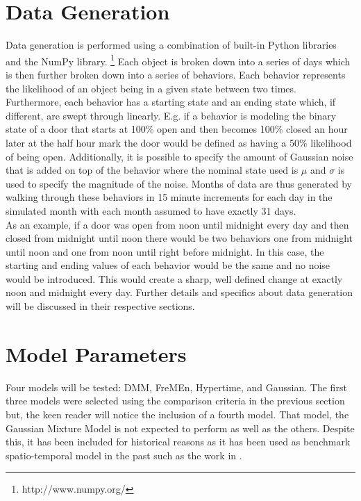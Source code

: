  \section{ Data Generation }

  Data generation is performed using a combination of built-in Python libraries and
  the NumPy library. \footnote[1]{http://www.numpy.org/} Each object is broken down into a series of days which is
  then further broken down into a series of behaviors. Each behavior
  represents the likelihood of an object being in a given state between two
  times. Furthermore, each behavior has a starting state and an ending state
  which, if different, are swept through linearly. E.g. if a behavior is
  modeling the binary state of a door that starts at 100\% open and then becomes
  100\% closed an hour later at the half hour mark the door would be defined as having
  a 50\% likelihood of being open. Additionally, it is possible
  to specify the amount of Gaussian noise that is added on top of the
  behavior where the nominal state used is $\mu$ and $\sigma$ is used to
  specify the magnitude of the noise. Months of data are thus generated by
  walking through these behaviors in 15 minute increments for each day in the
  simulated month with each month assumed to have exactly 31 days. \\

  As an example, if a door was open from noon until midnight every day and then closed from
  midnight until noon there would be two behaviors one from midnight until
  noon and one from noon until right before midnight. In this case, the
  starting and ending values of each behavior would be the same and no noise
  would be introduced. This would create a sharp, well defined change at
  exactly noon and midnight every day. Further details and specifics about data
  generation will be discussed in their respective sections. \\

  \section{ Model Parameters }

  Four models will be tested: DMM, FreMEn, Hypertime, and Gaussian. The first
  three models were selected using the comparison criteria in the previous
  section but, the keen reader will notice the inclusion of a fourth model.
  That model, the Gaussian Mixture Model is not
  expected to perform as well as the others. Despite this, it has been included
  for historical reasons as it has been used as benchmark spatio-temporal model
  in the past such as the work in \cite{Coppola2016}. \\


